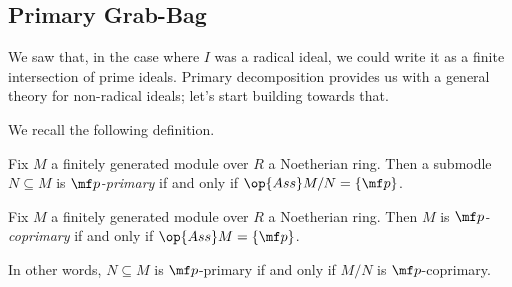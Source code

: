 \subsection{Primary Grab-Bag}
We saw that, in the case where $I$ was a radical ideal, we could write it as a finite intersection of prime ideals. Primary decomposition provides us with a general theory for non-radical ideals; let's start building towards that.

We recall the following definition.
\begin{definition}
	Fix $M$ a finitely generated module over $R$ a Noetherian ring. Then a submodle $N\subseteq M$ is \textit{$\mf p$-primary} if and only if $\op{Ass}M/N=\{\mf p\}$.
\end{definition}
\begin{definition}
	Fix $M$ a finitely generated module over $R$ a Noetherian ring. Then $M$ is \textit{$\mf p$-coprimary} if and only if $\op{Ass}M=\{\mf p\}$.
\end{definition}
In other words, $N\subseteq M$ is $\mf p$-primary if and only if $M/N$ is $\mf p$-coprimary.

